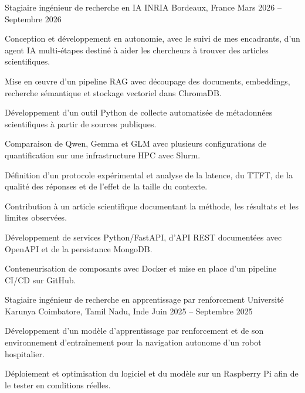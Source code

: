 
\begin{cventries}
  \cventry
    {Stagiaire ingénieur de recherche en IA}
    {INRIA}
    {Bordeaux, France}
    {Mars 2026 -- Septembre 2026}
    {
      \begin{cvitems}
        \item {Conception et développement en autonomie, avec le suivi de mes encadrants, d’un agent IA multi-étapes destiné à aider les chercheurs à trouver des articles scientifiques.}
        \item {Mise en œuvre d’un pipeline RAG avec découpage des documents, embeddings, recherche sémantique et stockage vectoriel dans ChromaDB.}
        \item {Développement d’un outil Python de collecte automatisée de métadonnées scientifiques à partir de sources publiques.}
        \item {Comparaison de Qwen, Gemma et GLM avec plusieurs configurations de quantification sur une infrastructure HPC avec Slurm.}
        \item {Définition d’un protocole expérimental et analyse de la latence, du TTFT, de la qualité des réponses et de l’effet de la taille du contexte.}
        \item {Contribution à un article scientifique documentant la méthode, les résultats et les limites observées.}
        \item {Développement de services Python/FastAPI, d’API REST documentées avec OpenAPI et de la persistance MongoDB.}
        \item {Conteneurisation de composants avec Docker et mise en place d’un pipeline CI/CD sur GitHub.}
      \end{cvitems}
    }

  \cventry
    {Stagiaire ingénieur de recherche en apprentissage par renforcement}
    {Université Karunya}
    {Coimbatore, Tamil Nadu, Inde}
    {Juin 2025 -- Septembre 2025}
    {
      \begin{cvitems}
        \item {Développement d’un modèle d’apprentissage par renforcement et de son environnement d’entraînement pour la navigation autonome d’un robot hospitalier.}
        \item {Déploiement et optimisation du logiciel et du modèle sur un Raspberry Pi afin de le tester en conditions réelles.}
      \end{cvitems}
    }
\end{cventries}
